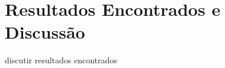 \chapter{Resultados Encontrados e Discussão}
\label{cap:discussao}

discutir resultados encontrados

